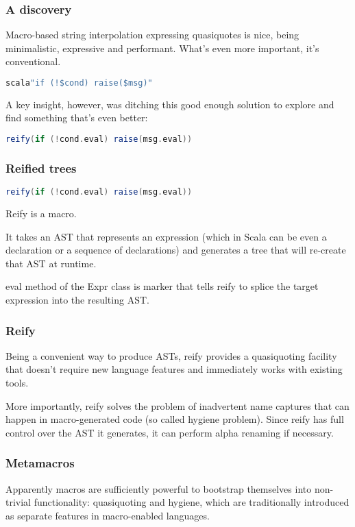 \documentclass[hyperref={bookmarks=false}]{beamer}
\begin{document}
\begin{frame}[fragile]
\frametitle{A discovery}

Macro-based string interpolation expressing quasiquotes is nice, being minimalistic, expressive and performant. What's even more important, it's conventional.

\begin{lstlisting}[language=scala]
scala"if (!$cond) raise($msg)"
\end{lstlisting}

A key insight, however, was ditching this good enough solution to explore and find something that's even better:

\begin{lstlisting}[language=scala]
reify(if (!cond.eval) raise(msg.eval))
\end{lstlisting}
\end{frame}

\begin{frame}[fragile]
\frametitle{Reified trees}

\begin{lstlisting}[language=scala]
reify(if (!cond.eval) raise(msg.eval))
\end{lstlisting}

Reify is a macro.

It takes an AST that represents an expression (which in Scala can be even a declaration or a sequence of declarations) and generates a tree that will re-create that AST at runtime.

eval method of the Expr class is marker that tells reify to splice the target expression into the resulting AST.

\end{frame}

\begin{frame}[fragile]
\frametitle{Reify}

Being a convenient way to produce ASTs, reify provides a quasiquoting facility that doesn't require new language features and immediately works with existing tools.

More importantly, reify solves the problem of inadvertent name captures that can happen in macro-generated code (so called hygiene problem). Since reify has full control over the AST it generates, it can perform alpha renaming if necessary.

\end{frame}

\begin{frame}[fragile]
\frametitle{Metamacros}
Apparently macros are sufficiently powerful to bootstrap themselves into non-trivial functionality: quasiquoting and hygiene, which are traditionally introduced as separate features in macro-enabled languages.
\end{frame}
\end{document}

